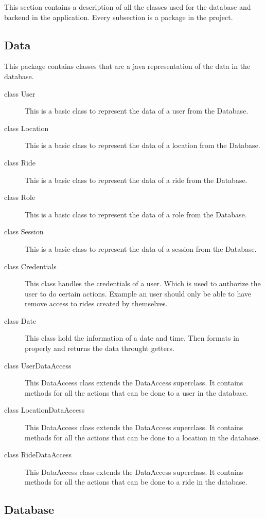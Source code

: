 \documentclass{article}
\begin{document}
This section contains a description of all the classes used for the database and backend in the application. Every subsection is a package in the project.

\subsection{Data}

This package contains classes that are a java representation of the data in the database.

\begin{description}
    \item[class User] This is a basic class to represent the data of a user from the Database.
    \item[class Location] This is a basic class to represent the data of a location from the Database.
    \item[class Ride] This is a basic class to represent the data of a ride from the Database.
    \item[class Role] This is a basic class to represent the data of a role from the Database.
    \item[class Session] This is a basic class to represent the data of a session from the Database.
    \item[class Credentials] This class handles the credentials of a user. Which is used to authorize the user to do certain actions. Example an user should only be able to have remove access to rides created by themselves.
    \item[class Date] This class hold the information of a date and time. Then formats in properly and returns the data throught getters.
    \item[class UserDataAccess] This DataAccess class extends the DataAccess superclass. It contains methods for all the actions that can be done to a user in the database.
    \item[class LocationDataAccess] This DataAccess class extends the DataAccess superclass. It contains methods for all the actions that can be done to a location in the database.
    \item[class RideDataAccess] This DataAccess class extends the DataAccess superclass. It contains methods for all the actions that can be done to a ride in the database.
\end{description}

\subsection{Database}
\end{document}
